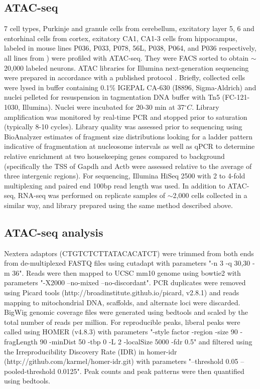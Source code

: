 \subsection{ATAC-seq}
7 cell types, Purkinje and granule cells from cerebellum, excitatory layer 5, 6 and entorhinal cells from cortex, exitatory CA1, CA1-3 cells from hippocampus, labeled in mouse lines P036, P033, P078, 56L, P038, P064, and P036 respectively, all lines from \cite{Shima_2016}) were profiled with ATAC-seq. They were FACS sorted to obtain $\sim$20,000 labeled neurons. ATAC libraries for Illumina next-generation sequencing were prepared in accordance with a published protocol \citep{Buenrostro_2013}. Briefly, collected cells were lysed in buffer containing 0.1\% IGEPAL CA-630 (I8896, Sigma-Aldrich) and nuclei pelleted for resuspension in tagmentation DNA buffer with Tn5 (FC-121-1030, Illumina). Nuclei were incubated for 20-30 min at 37$^{\circ}C$. Library amplification was monitored by real-time PCR and stopped prior to saturation (typically 8-10 cycles). Library quality was assessed prior to sequencing using BioAnalyzer estimates of fragment size distributions looking for a ladder pattern indicative of fragmentation at nucleosome intervals as well as qPCR to determine relative enrichment at two housekeeping genes compared to background (specifically the TSS of Gapdh and Actb were assessed relative to the average of three intergenic regions). For sequencing, Illumina HiSeq 2500 with 2 to 4-fold multiplexing and paired end 100bp read length was used. In addition to ATAC-seq, RNA-seq was performed on replicate samples of $\sim$2,000 cells collected in a similar way, and library prepared using the same method described above.


\subsection{ATAC-seq analysis}
Nextera adaptors (CTGTCTCTTATACACATCT) were trimmed from both ends from de-multiplexed FASTQ files using cutadapt with parameters "-n 3 -q 30,30 -m 36". Reads were then mapped to UCSC mm10 genome using bowtie2 \citep{Langmead_2012} with parameters "-X2000 --no-mixed --no-discordant". PCR duplicates were removed using Picard tools (http://broadinstitute.github.io/picard, v2.8.1) and reads mapping to mitochondrial DNA, scaffolds, and alternate loci were discarded. BigWig genomic coverage files were generated using bedtools \citep{Quinlan_2010} and scaled by the total number of reads per million. For reproducible peaks, liberal peaks were called using HOMER (v4.8.3) \citep{Heinz_2010} with parameters "-style factor -region -size 90 -fragLength 90 -minDist 50 -tbp 0 -L 2 -localSize 5000 -fdr 0.5" and filtered using the Irreproducibility Discovery Rate (IDR) in homer-idr (http://github.com/karmel/homer-idr.git) with parameters "--threshold 0.05 --pooled-threshold 0.0125". Peak counts and peak patterns were then quantified using bedtools.


